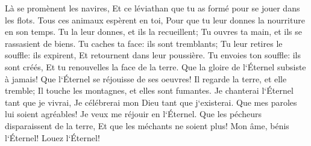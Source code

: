 \verse Là se promènent les navires, Et ce léviathan que tu as formé pour se jouer dans les flots. 
\verse Tous ces animaux espèrent en toi, Pour que tu leur donnes la nourriture en son temps. 
\verse Tu la leur donnes, et ils la recueillent; Tu ouvres ta main, et ils se rassasient de biens. 
\verse Tu caches ta face: ils sont tremblants; Tu leur retires le souffle: ils expirent, Et retournent dans leur poussière. 
\verse Tu envoies ton souffle: ils sont créés, Et tu renouvelles la face de la terre. 
\verse Que la gloire de l`Éternel subsiste à jamais! Que l`Éternel se réjouisse de ses oeuvres! 
\verse Il regarde la terre, et elle tremble; Il touche les montagnes, et elles sont fumantes. 
\verse Je chanterai l`Éternel tant que je vivrai, Je célébrerai mon Dieu tant que j`existerai. 
\verse Que mes paroles lui soient agréables! Je veux me réjouir en l`Éternel. 
\verse Que les pécheurs disparaissent de la terre, Et que les méchants ne soient plus! Mon âme, bénis l`Éternel! Louez l`Éternel! 

